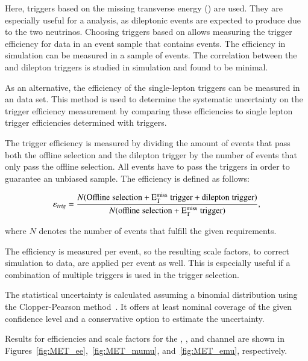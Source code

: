 Here, triggers based on the missing transverse energy (\ETm) are used. They are especially useful for a \ttbar analysis, 
as dileptonic \ttbar events are expected to produce \ETm due to the two neutrinos. Choosing triggers based on \ETm allows measuring the trigger efficiency for data
in an event sample that contains \ttbar events. The efficiency in simulation can be measured in a sample of \ttbar events.
The correlation between the \ETm and dilepton triggers is studied in simulation and found to be minimal.

As an alternative, the efficiency of the single-lepton triggers can be measured in an \emu data set.
This method is used to determine the systematic uncertainty on the trigger efficiency measurement by comparing these efficiencies to single lepton trigger efficiencies determined with \ETm triggers.

The trigger efficiency is measured by dividing the amount of events that pass both the offline selection and the dilepton trigger by the number of events that only pass the offline selection.
All events have to pass the \ETm triggers in order to guarantee an unbiased sample. The efficiency is defined as follows: 

\begin{equation}
\varepsilon_{trig} = \frac{N(\mathrm{Offline\; selection + E_{\mathrm{T}}^{\text{miss}} \; trigger + dilepton\; trigger})}{N(\mathrm{offline\; selection + E_{\mathrm{T}}^{\text{miss}} \; trigger})},
\label{eq:TriggerEff}
\end{equation}

where $N$ denotes the number of events that fulfill the given requirements.

The efficiency is measured per event, so the resulting scale factors, to correct simulation to data, are applied per event as well.
This is especially useful if a combination of multiple triggers is used in the trigger selection.

The statistical uncertainty is calculated assuming a binomial distribution using the Clopper-Pearson method~\cite{10.2307/2331986,2010NIMPA.612..388C}. It offers at least nominal coverage 
of the given confidence level and a conservative option to estimate the uncertainty. 

Results for efficiencies and scale factors for the \ee, \mumu, and \emu channel are shown in Figures~\ref{fig:MET_ee},~\ref{fig:MET_mumu}, and~\ref{fig:MET_emu}, respectively.

